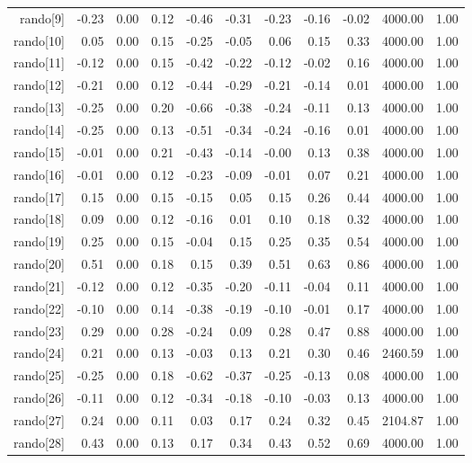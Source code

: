 \begin{table}[ht]
\begin{tabular}{rrrrrrrrrrr}
  rando[9] & -0.23 & 0.00 & 0.12 & -0.46 & -0.31 & -0.23 & -0.16 & -0.02 & 4000.00 & 1.00 \\ 
  rando[10] & 0.05 & 0.00 & 0.15 & -0.25 & -0.05 & 0.06 & 0.15 & 0.33 & 4000.00 & 1.00 \\ 
  rando[11] & -0.12 & 0.00 & 0.15 & -0.42 & -0.22 & -0.12 & -0.02 & 0.16 & 4000.00 & 1.00 \\ 
  rando[12] & -0.21 & 0.00 & 0.12 & -0.44 & -0.29 & -0.21 & -0.14 & 0.01 & 4000.00 & 1.00 \\ 
  rando[13] & -0.25 & 0.00 & 0.20 & -0.66 & -0.38 & -0.24 & -0.11 & 0.13 & 4000.00 & 1.00 \\ 
  rando[14] & -0.25 & 0.00 & 0.13 & -0.51 & -0.34 & -0.24 & -0.16 & 0.01 & 4000.00 & 1.00 \\ 
  rando[15] & -0.01 & 0.00 & 0.21 & -0.43 & -0.14 & -0.00 & 0.13 & 0.38 & 4000.00 & 1.00 \\ 
  rando[16] & -0.01 & 0.00 & 0.12 & -0.23 & -0.09 & -0.01 & 0.07 & 0.21 & 4000.00 & 1.00 \\ 
  rando[17] & 0.15 & 0.00 & 0.15 & -0.15 & 0.05 & 0.15 & 0.26 & 0.44 & 4000.00 & 1.00 \\ 
  rando[18] & 0.09 & 0.00 & 0.12 & -0.16 & 0.01 & 0.10 & 0.18 & 0.32 & 4000.00 & 1.00 \\ 
  rando[19] & 0.25 & 0.00 & 0.15 & -0.04 & 0.15 & 0.25 & 0.35 & 0.54 & 4000.00 & 1.00 \\ 
  rando[20] & 0.51 & 0.00 & 0.18 & 0.15 & 0.39 & 0.51 & 0.63 & 0.86 & 4000.00 & 1.00 \\ 
  rando[21] & -0.12 & 0.00 & 0.12 & -0.35 & -0.20 & -0.11 & -0.04 & 0.11 & 4000.00 & 1.00 \\ 
  rando[22] & -0.10 & 0.00 & 0.14 & -0.38 & -0.19 & -0.10 & -0.01 & 0.17 & 4000.00 & 1.00 \\ 
  rando[23] & 0.29 & 0.00 & 0.28 & -0.24 & 0.09 & 0.28 & 0.47 & 0.88 & 4000.00 & 1.00 \\ 
  rando[24] & 0.21 & 0.00 & 0.13 & -0.03 & 0.13 & 0.21 & 0.30 & 0.46 & 2460.59 & 1.00 \\ 
  rando[25] & -0.25 & 0.00 & 0.18 & -0.62 & -0.37 & -0.25 & -0.13 & 0.08 & 4000.00 & 1.00 \\ 
  rando[26] & -0.11 & 0.00 & 0.12 & -0.34 & -0.18 & -0.10 & -0.03 & 0.13 & 4000.00 & 1.00 \\ 
  rando[27] & 0.24 & 0.00 & 0.11 & 0.03 & 0.17 & 0.24 & 0.32 & 0.45 & 2104.87 & 1.00 \\ 
  rando[28] & 0.43 & 0.00 & 0.13 & 0.17 & 0.34 & 0.43 & 0.52 & 0.69 & 4000.00 & 1.00 \\ 

\end{tabular}
\end{table}
